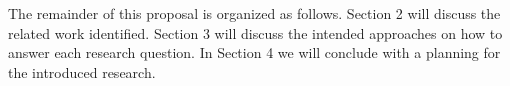 




 
The remainder of this proposal is organized as follows. Section 2 will discuss the related work identified. Section 3 will discuss the intended approaches on how to answer each research question. In Section 4 we will conclude with a planning for the introduced research. 


